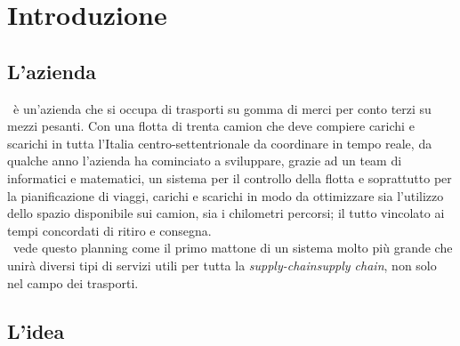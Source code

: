 
\chapter{Introduzione}
\label{cap:introduzione}


\section{L'azienda}

\TS\ è un'azienda che si occupa di trasporti su gomma di merci per conto terzi su mezzi pesanti. Con una flotta di trenta camion che deve compiere carichi e scarichi in tutta l'Italia centro-settentrionale da coordinare in tempo reale, da qualche anno l'azienda ha cominciato a sviluppare, grazie ad un team di informatici e matematici, un sistema per il controllo della flotta e soprattutto per la pianificazione di viaggi, carichi e scarichi in modo da ottimizzare sia l'utilizzo dello spazio disponibile sui camion, sia i chilometri percorsi; il tutto vincolato ai tempi concordati di ritiro e consegna. \\
\TS\ vede questo planning come il primo mattone di un sistema molto più grande che unirà diversi tipi di servizi utili per tutta la \emph{\gls{supply-chain}supply chain}\glsfirstoccur, non solo nel campo dei trasporti.

\section{L'idea}

